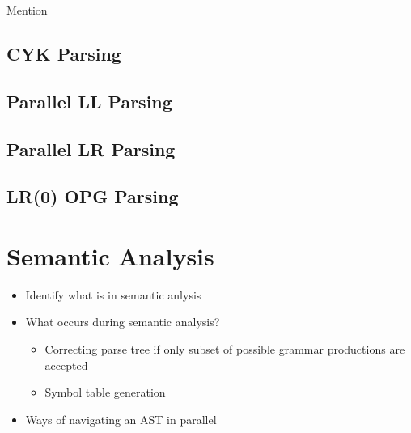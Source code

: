 \begin{roughwork}
Mention \cite{mark_thierry_vandevoorde_parallel_1988, alblas_bibliography_1994}
\end{roughwork}


\subsection{CYK Parsing}
\cite{skrzypczak_parallel_nodate}
\subsection{Parallel LL Parsing}
\cite{robin_voetter_parallel_2021}
\subsection{Parallel LR Parsing}
\cite{clarke_error_1993}
\subsection{LR(0) OPG Parsing}
\cite{barenghi_parallel_2015, li_associative_2023}

\section{Semantic Analysis} \label{lit_review_analysis}
\begin{sectionplan}
    \begin{itemize}
        \item Identify what is in semantic anlysis
        \item What occurs during semantic analysis?
        \begin{itemize}
            \item Correcting parse tree if only subset of possible grammar productions are accepted
            \item Symbol table generation
        \end{itemize}
        \item Ways of navigating an AST in parallel
    \end{itemize}
\end{sectionplan}
